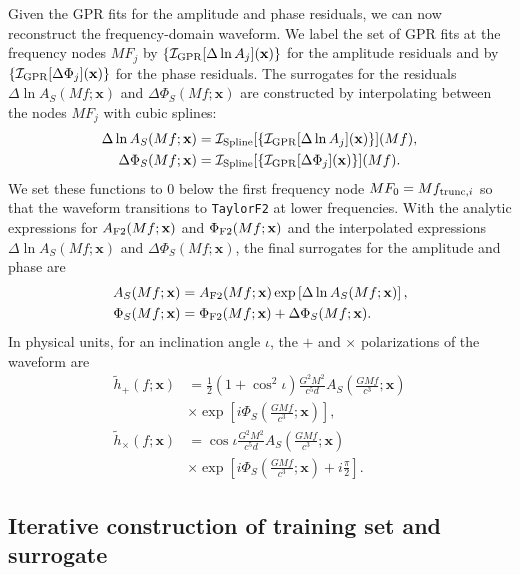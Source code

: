 \documentclass[prd,aps,letter,twocolumn,floatfix,notitlepage,nofootinbib]{revtex4-1}
\def\bx{\mathbf{x}}
\begin{document}
Given the GPR fits for the amplitude and phase residuals, we can now reconstruct the frequency-domain waveform. We label the set of GPR fits at the frequency nodes $MF_j$ by $\{\mathcal{I}_{\rm GPR}[\Delta\ln A_j](\bx)\}$ for the amplitude residuals and by $\{\mathcal{I}_{\rm GPR}[\Delta\Phi_j](\bx)\}$ for the phase residuals. The surrogates for the residuals $\Delta\ln A_S(Mf;\bx)$ and $\Delta\Phi_S(Mf;\bx)$ are constructed by interpolating between the nodes $MF_j$ with cubic splines:
\begin{align}
\Delta\ln A_S(Mf;\bx) &= \mathcal{I}_{\rm Spline}[\{\mathcal{I}_{\rm GPR}[\Delta\ln A_j](\bx)\}](Mf),\\
\Delta\Phi_S(Mf;\bx) &= \mathcal{I}_{\rm Spline}[\{\mathcal{I}_{\rm GPR}[\Delta\Phi_j](\bx)\}](Mf).
\end{align}
We set these functions to 0 below the first frequency node $MF_0 =  Mf_{{\rm trunc},i}$ so that the waveform transitions to \texttt{TaylorF2} at lower frequencies. With the analytic expressions for $A_{\rm F2}(Mf;\bx)$ and $\Phi_{\rm F2}(Mf;\bx)$ and the interpolated expressions $\Delta\ln A_S(Mf;\bx)$ and $\Delta\Phi_S(Mf;\bx)$, the final surrogates for the amplitude and phase are
\begin{align}
\label{eq:amp_sur}
A_S(Mf;\bx) &= A_{\rm F2}(Mf;\bx) \exp\left[ \Delta\ln A_S(Mf;\bx) \right], \\
\label{eq:phase_sur}
\Phi_S(Mf;\bx) &= \Phi_{\rm F2}(Mf;\bx) + \Delta\Phi_S(Mf;\bx).
\end{align}
In physical units, for an inclination angle $\iota$, the $+$ and $\times$ polarizations of the waveform are 
\begin{align}
\label{eq:hplus_sur}
\tilde h_+(f; \bx) &= \frac{1}{2}(1+\cos^2\iota) \frac{G^2 M^2}{c^5 d} A_S\left(\frac{GMf}{c^3}; \bx\right) \nonumber \\
& \times \exp\left[i \Phi_S\left(\frac{GMf}{c^3}; \bx\right)\right], \\
\label{eq:hcross_sur}
\tilde h_\times(f; \bx) &= \cos\iota \frac{G^2 M^2}{c^5 d} A_S\left(\frac{GMf}{c^3}; \bx\right) \nonumber \\
& \times \exp\left[i \Phi_S\left(\frac{GMf}{c^3}; \bx\right) + i \frac{\pi}{2}\right].
\end{align}


\subsection{Iterative construction of training set and surrogate}
\label{sec:design}
\end{document}
